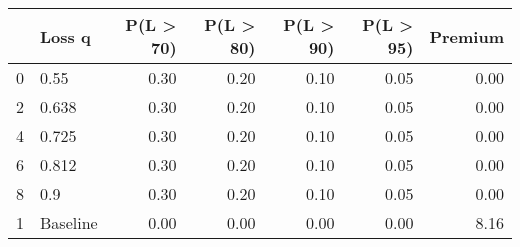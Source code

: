 \begin{tabular}{llrrrrr}
\toprule
{} &    Loss q &  P(L > 70) &  P(L > 80) &  P(L > 90) &  P(L > 95) &  Premium \\
\midrule
0 &      0.55 &       0.30 &       0.20 &       0.10 &       0.05 &     0.00 \\
2 &     0.638 &       0.30 &       0.20 &       0.10 &       0.05 &     0.00 \\
4 &     0.725 &       0.30 &       0.20 &       0.10 &       0.05 &     0.00 \\
6 &     0.812 &       0.30 &       0.20 &       0.10 &       0.05 &     0.00 \\
8 &       0.9 &       0.30 &       0.20 &       0.10 &       0.05 &     0.00 \\
1 &  Baseline &       0.00 &       0.00 &       0.00 &       0.00 &     8.16 \\
\bottomrule
\end{tabular}
